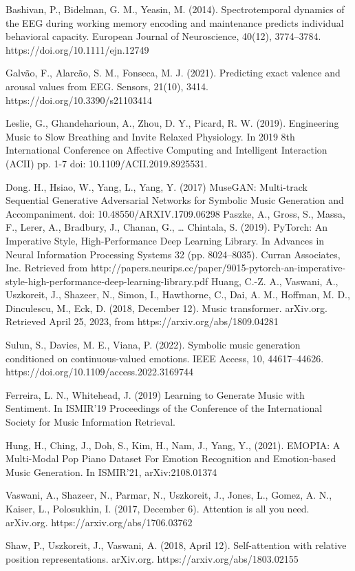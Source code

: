 \documentclass[14pt]{extreport}
\begin{document}
\begin{thebibliography}{20}
Bashivan, P., Bidelman, G. M., Yeasin, M. (2014). Spectrotemporal dynamics of the EEG during working memory encoding and maintenance predicts individual behavioral capacity. European Journal of Neuroscience, 40(12), 3774–3784. https://doi.org/10.1111/ejn.12749

Galvão, F., Alarcão, S. M., Fonseca, M. J. (2021). Predicting exact valence and arousal values from EEG. Sensors, 21(10), 3414. https://doi.org/10.3390/s21103414 

Leslie, G., Ghandeharioun, A., Zhou, D. Y., Picard, R. W. (2019). Engineering Music to Slow Breathing and Invite Relaxed Physiology. In 2019 8th International Conference on Affective Computing and Intelligent Interaction (ACII) pp. 1-7 doi: 10.1109/ACII.2019.8925531.

Dong. H., Hsiao, W., Yang, L., Yang, Y. (2017) MuseGAN: Multi-track Sequential Generative Adversarial Networks for Symbolic Music Generation and Accompaniment.
doi: 10.48550/ARXIV.1709.06298
Paszke, A., Gross, S., Massa, F., Lerer, A., Bradbury, J., Chanan, G., … Chintala, S. (2019). PyTorch: An Imperative Style, High-Performance Deep Learning Library. In Advances in Neural Information Processing Systems 32 (pp. 8024–8035). Curran Associates, Inc. Retrieved from http://papers.neurips.cc/paper/9015-pytorch-an-imperative-style-high-performance-deep-learning-library.pdf
Huang, C.-Z. A., Vaswani, A., Uszkoreit, J., Shazeer, N., Simon, I., Hawthorne, C., Dai, A. M., Hoffman, M. D., Dinculescu, M., Eck, D. (2018, December 12). Music transformer. arXiv.org. Retrieved April 25, 2023, from https://arxiv.org/abs/1809.04281 

Sulun, S., Davies, M. E., Viana, P. (2022). Symbolic music generation conditioned on continuous-valued emotions. IEEE Access, 10, 44617–44626. https://doi.org/10.1109/access.2022.3169744 

Ferreira, L. N., Whitehead, J. (2019) Learning to Generate Music with Sentiment. In ISMIR'19 Proceedings of the Conference of the International Society for Music Information Retrieval. 

Hung, H., Ching, J., Doh, S., Kim, H., Nam, J., Yang, Y., (2021).
EMOPIA: A Multi-Modal Pop Piano Dataset For Emotion Recognition and Emotion-based Music Generation. In ISMIR'21, arXiv:2108.01374

Vaswani, A., Shazeer, N., Parmar, N., Uszkoreit, J., Jones, L., Gomez, A. N., Kaiser, L., Polosukhin, I. (2017, December 6). Attention is all you need. arXiv.org. https://arxiv.org/abs/1706.03762 

Shaw, P., Uszkoreit, J., Vaswani, A. (2018, April 12). Self-attention with relative position representations. arXiv.org. https://arxiv.org/abs/1803.02155 
\end{thebibliography}
\end{document}
